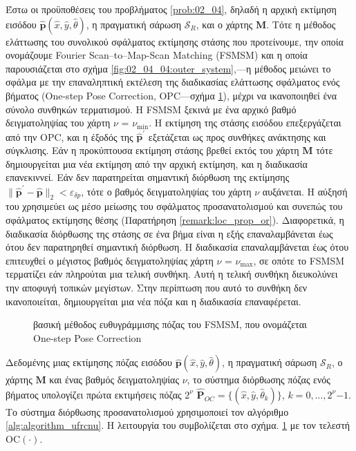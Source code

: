 Έστω οι προϋποθέσεις του προβλήματος \ref{prob:02_04}, δηλαδή
η αρχική εκτίμηση εισόδου $\hat{\bm{p}}(\hat{x}, \hat{y}, \hat{\theta})$,
η πραγματική σάρωση $\mathcal{S}_R$, και ο χάρτης $\bm{M}$. Τότε
η μέθοδος ελάττωσης του συνολικού σφάλματος εκτίμησης στάσης που προτείνουμε,
την οποία ονομάζουμε Fourier Scan--to--Map-Scan Matching (FSMSM) και η οποία
παρουσιάζεται στο σχήμα \ref{fig:02_04_04:outer_system},---η μέθοδος μειώνει το
σφάλμα με την επαναληπτική εκτέλεση της διαδικασίας ελάττωσης σφάλματος ενός
βήματος (One-step Pose Correction, OPC---σχήμα \ref{fig:02_04_04:inner_system}),
μέχρι να ικανοποιηθεί ένα σύνολο συνθηκών τερματισμού. Η FSMSM ξεκινά με ένα
αρχικό βαθμό δειγματοληψίας του χάρτη $\nu$ = $\nu_{\min}$. Η εκτίμηση της
στάσης εισόδου επεξεργάζεται από την OPC, και η έξοδός της
$\hat{\bm{p}}^\prime$ εξετάζεται ως προς συνθήκες ανάκτησης και
σύγκλισης. Εάν η προκύπτουσα εκτίμηση στάσης βρεθεί εκτός του χάρτη $\bm{M}$
τότε δημιουργείται μια νέα εκτίμηση από την αρχική
εκτίμηση, και η διαδικασία επανεκιννεί. Εάν δεν παρατηρείται σημαντική
διόρθωση της εκτίμησης
$\|\hat{\bm{p}}^\prime-\hat{\bm{p}}\|_2 < \varepsilon_{\delta p}$, τότε ο
βαθμός δειγματοληψίας του χάρτη $\nu$ αυξάνεται. Η αύξησή του χρησιμεύει ως
μέσο μείωσης του σφάλματος προσανατολισμού και συνεπώς του σφάλματος εκτίμησης
θέσης (Παρατήρηση \ref{remark:loc_prop_or}). Διαφορετικά, η διαδικασία
διόρθωσης της στάσης σε ένα βήμα είναι η εξής επαναλαμβάνεται έως ότου δεν
παρατηρηθεί σημαντική διόρθωση. Η διαδικασία επαναλαμβάνεται έως ότου
επιτευχθεί ο μέγιστος βαθμός δειγματοληψίας χάρτη $\nu$ = $\nu_{\max}$, σε
οπότε το FSMSM τερματίζει εάν πληρούται μια τελική συνθήκη. Αυτή η τελική
συνθήκη διευκολύνει την αποφυγή τοπικών μεγίστων. Στην περίπτωση που αυτό το
συνθήκη δεν ικανοποιείται, δημιουργείται μια νέα πόζα και η διαδικασία
επαναφέρεται.

\begin{figure}[!h]\centering
  
  \caption{\small  βασική μέθοδος ευθυγράμμισης πόζας του FSMSM, που ονομάζεται
           One-step Pose Correction}
  \label{fig:02_04_04:inner_system}
\end{figure}


Δεδομένης μιας εκτίμησης πόζας εισόδου $\hat{\bm{p}}(\hat{x}, \hat{y},
\hat{\theta})$, η πραγματική σάρωση $\mathcal{S}_R$, ο χάρτης $\bm{M}$ και ένας
βαθμός δειγματοληψίας $\nu$, το σύστημα διόρθωσης πόζας ενός βήματος υπολογίζει
πρώτα εκτιμήσεις πόζας $2^\nu$ $\hat{\bm{P}}_{OC} = \{(\hat{x}, \hat{y},
\hat{\theta}_k)\}$, $k = 0,\dots,2^\nu$$-$$1$. Το σύστημα διόρθωσης
προσανατολισμού χρησιμοποιεί τον αλγόριθμο \ref{alg:algorithm_ufrcnu}. Η
λειτουργία του συμβολίζεται στο σχήμα.  \ref{fig:02_04_04:inner_system} με τον τελεστή
OC$(\cdot)$.


